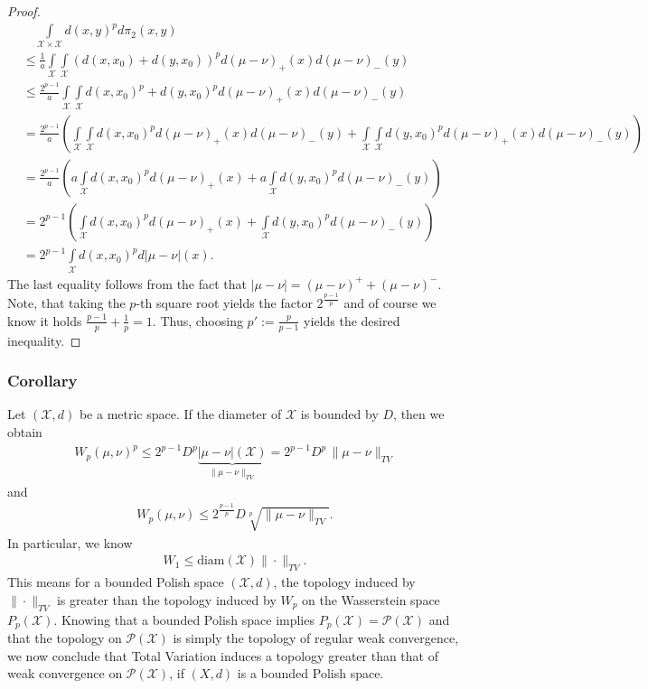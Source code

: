 \documentclass[11pt,a4paper]{article}
\begin{document}
\begin{proof}
\begin{align*}
&\hspace{1em}\int\limits_{\mathcal{X\times{}X}}d(x,y)^pd\pi_2(x,y)\\&\leq\frac{1}{a}\int\limits_{\mathcal{X}}\int\limits_{\mathcal{X}}(d(x,x_0)+d(y,x_0))^pd(\mu-\nu)_{+}(x)d(\mu-\nu)_{-}(y)\\&\leq\frac{2^{p-1}}{a}\int\limits_{\mathcal{X}}\int\limits_{\mathcal{X}}d(x,x_0)^p+d(y,x_0)^pd(\mu-\nu)_{+}(x)d(\mu-\nu)_{-}(y)\\&=\frac{2^{p-1}}{a}\left(\int\limits_{\mathcal{X}}\int\limits_{\mathcal{X}}d(x,x_0)^pd(\mu-\nu)_{+}(x)d(\mu-\nu)_{-}(y)+\int\limits_{\mathcal{X}}\int\limits_{\mathcal{X}}d(y,x_0)^pd(\mu-\nu)_{+}(x)d(\mu-\nu)_{-}(y)\right)\\&=\frac{2^{p-1}}{a}\left(a\int\limits_{\mathcal{X}}d(x,x_0)^pd(\mu-\nu)_{+}(x)+a\int\limits_{\mathcal{X}}d(y,x_0)^pd(\mu-\nu)_{-}(y)\right)\\&=2^{p-1}\left(\int\limits_{\mathcal{X}}d(x,x_0)^pd(\mu-\nu)_{+}(x)+\int\limits_{\mathcal{X}}d(y,x_0)^pd(\mu-\nu)_{-}(y)\right)\\&=2^{p-1}\int\limits_{\mathcal{X}}d(x,x_0)^pd|\mu-\nu|(x).\hspace{27em}
\end{align*}
The last equality follows from the fact that $|\mu-\nu| = (\mu-\nu)^{+}+(\mu-\nu)^{-}.$ Note, that taking the $p$-th square root yields the factor $2^\frac{p-1}{p}$ and of course we know it holds $\frac{p-1}{p}+\frac{1}{p}=1$. Thus, choosing $p':=\frac{p}{p-1}$ yields the desired inequality.
\end{proof}
\subsubsection{Corollary}
Let $(\mathcal{X},d)$ be a metric space. If the diameter of $\mathcal{X}$ is bounded by $D$, then we obtain 
\begin{align*}
W_p(\mu,\nu)^p\leq{}2^{p-1}D^p\underbrace{|\mu-\nu|(\mathcal{X})}_{\|\mu-\nu\|_{TV}} = 2^{p-1}D^p\,\|\mu-\nu\|_{TV}
\end{align*}
and
\begin{align*}
W_p(\mu,\nu)\leq{}2^{\frac{p-1}{p}}D\sqrt[p]{\|\mu-\nu\|_{TV}}.
\end{align*}
In particular, we know 
\begin{align*}
W_1\leq\text{diam}(\mathcal{X})\|\cdot\|_{TV}.
\end{align*}
This means for a bounded Polish space $(\mathcal{X},d)$, the topology induced by $\|\cdot\|_{TV}$ is greater than the topology induced by $W_p$ on the Wasserstein space $P_p(\mathcal{X})$. Knowing that a bounded Polish space implies $P_p(\mathcal{X})=\mathcal{P(X)}$ and that the topology on $\mathcal{P(X)}$ is simply the topology of regular weak convergence, we now conclude that Total Variation induces a topology greater than that of weak convergence on $\mathcal{P(X)}$, if $(X,d)$ is a bounded Polish space.
\end{document}
